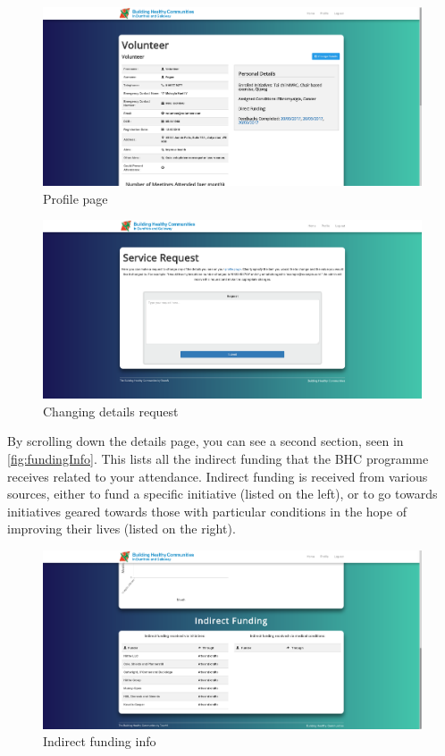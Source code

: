 \documentclass{bhcguides}
\begin{document}
\begin{figure}[h]
 \centerline{\includegraphics[width=\textwidth, height=\textheight, keepaspectratio]{profilepage.png}}
 \caption{Profile page}
 \label{fig:profilePage}
\end{figure}

\begin{figure}[h]
 \centerline{\includegraphics[width=\textwidth, height=\textheight, keepaspectratio]{detailchange.png}}
 \caption{Changing details request}
 \label{fig:detailChange}
\end{figure}

By scrolling down the details page, you can see a second section, seen in \autoref{fig:fundingInfo}. This lists all the indirect funding that the BHC programme receives related to your attendance. Indirect funding is received from various sources, either to fund a specific initiative (listed on the left), or to go towards initiatives geared towards those with particular conditions in the hope of improving their lives (listed on the right).

\begin{figure}[h]
 \centerline{\includegraphics[width=\textwidth, height=\textheight, keepaspectratio]{fundinginfo.png}}
 \caption{Indirect funding info}
 \label{fig:fundingInfo}
\end{figure}
\end{document}
